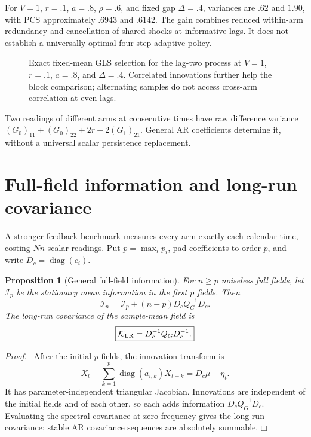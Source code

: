 \documentclass[11pt]{article}
\newtheorem{proposition}[theorem]{Proposition}
\newenvironment{proof}{\par\noindent\textit{Proof.}\ }{\hfill$\mdlgwhtsquare$\par\medskip}
\begin{document}
For $V=1$, $r=.1$, $a=.8$, $\rho=.6$, and fixed gap $\Delta=.4$, variances are $.62$ and $1.90$, with PCS approximately $.6943$ and $.6142$. The gain combines reduced within-arm redundancy and cancellation of shared shocks at informative lags. It does not establish a universally optimal four-step adaptive policy.

\begin{figure}[t]
\centering
{}
\caption{Exact fixed-mean GLS selection for the lag-two process at $V=1$, $r=.1$, $a=.8$, and $\Delta=.4$. Correlated innovations further help the block comparison; alternating samples do not access cross-arm correlation at even lags.}
\label{fig:pcs}
\end{figure}

Two readings of different arms at consecutive times have raw difference variance $(G_0)_{11}+(G_0)_{22}+2r-2(G_1)_{21}$. General AR coefficients determine it, without a universal scalar persistence replacement.

\section{Full-field information and long-run covariance}
A stronger feedback benchmark measures every arm exactly each calendar time, costing $Nn$ scalar readings. Put $p=\max_i p_i$, pad coefficients to order $p$, and write $D_c=\operatorname{diag}(c_i)$.

\begin{proposition}[General full-field information]
For $n\ge p$ noiseless full fields, let $\mathcal I_p$ be the stationary mean information in the first $p$ fields. Then
\begin{equation}
\boxed{\mathcal I_n=\mathcal I_p+(n-p)D_cQ_G^{-1}D_c.}
\label{eq:full-field}
\end{equation}
The long-run covariance of the sample-mean field is
\begin{equation}
\boxed{\mathcal K_{\rm LR}=D_c^{-1}Q_GD_c^{-1}.}
\label{eq:long-run}
\end{equation}
\end{proposition}
\begin{proof}
After the initial $p$ fields, the innovation transform is
\[
X_t-\sum_{k=1}^p\operatorname{diag}(a_{i,k})X_{t-k}=D_c\mu+\eta_t.
\]
It has parameter-independent triangular Jacobian. Innovations are independent of the initial fields and of each other, so each adds information $D_cQ_G^{-1}D_c$. Evaluating the spectral covariance at zero frequency gives the long-run covariance; stable AR covariance sequences are absolutely summable.
\end{proof}
\end{document}
